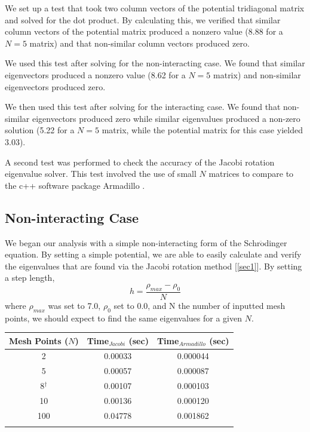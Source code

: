 \documentclass[%
reprint,
superscriptaddress,
showpacs,
nofootinbib,
bibnotes,amsmath,amssymb,aps,
prc, 
]{revtex4-1}
\begin{document}
	We set up a test that took two column vectors of the potential tridiagonal matrix and solved for the dot product.  By calculating this, we verified that similar column vectors of the potential matrix produced a nonzero value (8.88 for a $N=5$ matrix) and that non-similar column vectors produced zero.
	
	We used this test after solving for the non-interacting case.  We found that similar eigenvectors produced a nonzero value (8.62 for a $N=5$ matrix) and non-similar eigenvectors produced zero.
	
	We then used this test after solving for the interacting case.  We found that non-similar eigenvectors produced zero while similar eigenvalues produced a non-zero solution (5.22 for a $N=5$ matrix, while the potential matrix for this case yielded 3.03).
	
	A second test was performed to check the accuracy of the Jacobi rotation eigenvalue solver.  This test involved the use of small $N$ matrices to compare to the c++ software package Armadillo \cite{Armadillo}. 
	
	\subsection{Non-interacting Case}
	
	We began our analysis with a simple non-interacting form of the Schr$\ddot{\textrm{o}}$dinger equation.  By setting a simple potential, we are able to easily calculate and verify the eigenvalues that are found via the Jacobi rotation method [\ref{sec1}].  By setting a step length, \begin{equation}
	h=\frac{\rho_{max}-\rho_{0}}{N}
	\end{equation} where $\rho_{max}$ was set to 7.0, $\rho_{0}$ set to 0.0, and N the number of inputted mesh points, we should expect to find the same eigenvalues for a given $N$.
	
	\clearpage
	
	\begin{center}
		\begin{tabular}{ccc}
			\hline \hline
			Mesh Points ($N$) &  Time$_{Jacobi}$ (sec) & Time$_{Armadillo}$ (sec)\\
			\hline
			2 & 0.00033 & 0.000044\\
			5 & 0.00057 & 0.000087\\
			8$^{\dagger}$ & 0.00107 & 0.000103\\
			10 & 0.00136 & 0.000120\\
			100 & 0.04778 & 0.001862\\
			\hline
			\label{timetable}
		\end{tabular}
	\end{center}
	
\end{document}
